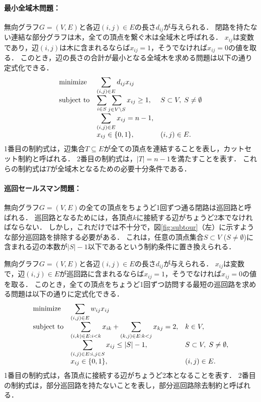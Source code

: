 \documentclass[japanese]{jnlp_1.4}
\begin{document}
\paragraph{最小全域木問題：}
無向グラフ$G=(V,E)$と各辺$(i,j) \in E$の長さ$d_{ij}$が与えられる．
閉路を持たない連結な部分グラフは木，全ての頂点を繋ぐ木は全域木と呼ばれる．
$x_{ij}$は変数であり，辺$(i,j)$は木に含まれるならば$x_{ij}=1$，そうでなければ$x_{ij}=0$の値を取る．
このとき，辺の長さの合計が最小となる全域木を求める問題は以下の通り定式化できる．
\begin{equation}
\begin{array}{lll}
\textnormal{minimize} & \displaystyle\sum_{(i,j) \in E} d_{ij} x_{ij} & \\
\textnormal{subject to} & \displaystyle\sum_{i \in S} \sum_{j \in V \setminus S} x_{ij} \ge 1, & S \subset V, \; S \not= \emptyset\\
& \displaystyle\sum_{(i,j) \in E} x_{ij} = n-1, & \\
 & x_{ij} \in \{ 0,1 \}, & (i,j) \in E.
\end{array}
\end{equation}
1番目の制約式は，辺集合$T \subseteq E$が全ての頂点を連結することを表し，カットセット制約と呼ばれる．
2番目の制約式は，$|T|=n-1$を満たすことを表す．
これらの制約式は$T$が全域木となるための必要十分条件である．

\paragraph{巡回セールスマン問題：}
無向グラフ$G=(V,E)$の全ての頂点をちょうど1回ずつ通る閉路は巡回路と呼ばれる．
巡回路となるためには，各頂点$k$に接続する辺がちょうど2本でなければならない．
しかし，これだけでは不十分で，図\ref{fig:subtour}（左）に示すような部分巡回路を排除する必要がある．
これは，任意の頂点集合$S \subset V$ ($S \not= \emptyset$)に含まれる辺の本数が$|S|-1$以下であるという制約条件に置き換えられる．

無向グラフ$G=(V,E)$と各辺$(i,j) \in E$の長さ$d_{ij}$が与えられる．
$x_{ij}$は変数で，辺$(i,j) \in E$が巡回路に含まれるならば$x_{ij}=1$，そうでなければ$x_{ij}=0$の値を取る．
このとき，全ての頂点をちょうど1回ずつ訪問する最短の巡回路を求める問題は以下の通りに定式化できる．
\pagebreak
\begin{equation}
\begin{array}{lll}
\textnormal{minimize} & \displaystyle\sum_{(i,j) \in E} w_{ij} x_{ij} & \\
\textnormal{subject to} & \displaystyle\sum_{(i,k) \in E: i < k} x_{ik} + \sum_{(k,j) \in E: k < j} x_{kj} = 2, & k \in V,\\
 & \displaystyle\sum_{(i,j) \in E: i,j \in S} x_{ij} \le |S|-1, & S \subset V, \; S \not= \emptyset,\\
 & x_{ij} \in \{ 0,1 \}, & (i,j) \in E.
\end{array}
\end{equation}
1番目の制約式は，各頂点に接続する辺がちょうど2本となることを表す．
2番目の制約式は，部分巡回路を持たないことを表し，部分巡回路除去制約と呼ばれる．
\end{document}

